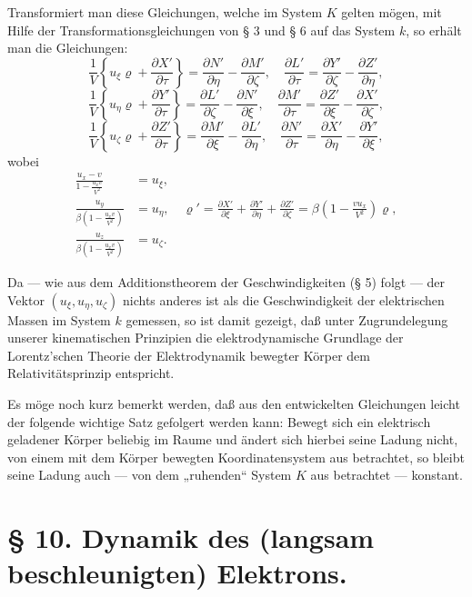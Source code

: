 \documentclass[17pt]{webarticle}       %
\begin{document}
Transformiert man diese Gleichungen, welche im System \( K \) gelten mögen, mit Hilfe der Transformationsgleichungen von § 3 und § 6 auf das System \( k \), so erhält man die Gleichungen:
\[
\frac{1}{V} \left\{ u_\xi \varrho + \frac{\partial X'}{\partial \tau} \right\} = \frac{\partial N'}{\partial \eta} - \frac{\partial M'}{\partial \zeta}, \quad \frac{\partial L'}{\partial \tau} = \frac{\partial Y'}{\partial \zeta} - \frac{\partial Z'}{\partial \eta},
\]
\[
\frac{1}{V} \left\{ u_\eta \varrho + \frac{\partial Y'}{\partial \tau} \right\} = \frac{\partial L'}{\partial \zeta} - \frac{\partial N'}{\partial \xi}, \quad \frac{\partial M'}{\partial \tau} = \frac{\partial Z'}{\partial \xi} - \frac{\partial X'}{\partial \zeta},
\]
\[
\frac{1}{V} \left\{ u_\zeta \varrho + \frac{\partial Z'}{\partial \tau} \right\} = \frac{\partial M'}{\partial \xi} - \frac{\partial L'}{\partial \eta}, \quad \frac{\partial N'}{\partial \tau} = \frac{\partial X'}{\partial \eta} - \frac{\partial Y'}{\partial \xi},
\]
wobei
\[
\begin{align*} 
\frac{u_x - v}{1 - \frac{u_x v}{V^2}} &= u_\xi,
\\
\frac{u_y}{\beta \left( 1 - \frac{u_x v}{V^2} \right)} &= u_\eta, \quad \varrho' = \frac{\partial X'}{\partial \xi} + \frac{\partial Y'}{\partial \eta} + \frac{\partial Z'}{\partial \zeta} = \beta \left( 1 - \frac{v u_x}{V^2} \right) \varrho,
\\
\frac{u_z}{\beta \left( 1 - \frac{u_x v}{V^2} \right)} &= u_\zeta.
\end{align*}
\]

Da — wie aus dem Additionstheorem der Geschwindigkeiten (§ 5) folgt — der Vektor \( (u_\xi, u_\eta, u_\zeta) \) nichts anderes ist als die Geschwindigkeit der elektrischen Massen im System \( k \) gemessen, so ist damit gezeigt, daß unter Zugrundelegung unserer kinematischen Prinzipien die elektrodynamische Grundlage der Lorentz'schen Theorie der Elektrodynamik bewegter Körper dem Relativitätsprinzip entspricht.

Es möge noch kurz bemerkt werden, daß aus den entwickelten Gleichungen leicht der folgende wichtige Satz gefolgert werden kann: Bewegt sich ein elektrisch geladener Körper beliebig im Raume und ändert sich hierbei seine Ladung nicht, von einem mit dem Körper bewegten Koordinatensystem aus betrachtet, so bleibt seine Ladung auch — von dem „ruhenden“ System \( K \) aus betrachtet — konstant.

\section*{§ 10. Dynamik des (langsam beschleunigten) Elektrons.}
\end{document}
